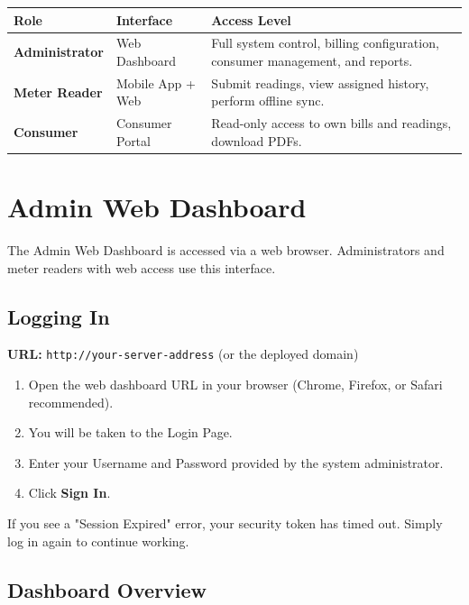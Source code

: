 \documentclass[12pt, a4paper]{report}
\begin{document}
\begin{table}[H]
\centering
\begin{tabularx}{\textwidth}{>{\bfseries}l l X}
\toprule
Role & Interface & Access Level \\
\midrule
Administrator & Web Dashboard & Full system control, billing configuration, consumer management, and reports. \\
Meter Reader & Mobile App + Web & Submit readings, view assigned history, perform offline sync. \\
Consumer & Consumer Portal & Read-only access to own bills and readings, download PDFs. \\
\bottomrule
\end{tabularx}
\end{table}

\chapter{Admin Web Dashboard}

The Admin Web Dashboard is accessed via a web browser. Administrators and meter readers with web access use this interface.

\section{Logging In}

\textbf{URL:} \texttt{http://your-server-address} (or the deployed domain)

\begin{enumerate}
    \item Open the web dashboard URL in your browser (Chrome, Firefox, or Safari recommended).
    \item You will be taken to the Login Page.
    \item Enter your Username and Password provided by the system administrator.
    \item Click \textbf{Sign In}.
\end{enumerate}

\begin{notebox}
If you see a "Session Expired" error, your security token has timed out. Simply log in again to continue working.
\end{notebox}

\section{Dashboard Overview}
\end{document}
